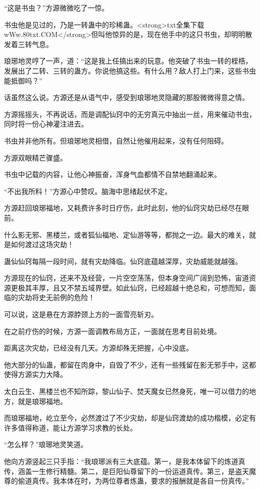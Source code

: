 \begin{this_body}
“这是书虫？”方源微微吃了一惊。

书虫他是见过的，乃是一转蛊中的珍稀蛊。<strong>txt全集下载wWw.80txt.COM</strong>但叫他惊异的是，现在他手中的这只书虫，却明明散发着三转气息。

琅琊地灵哼了一声，道：“这是我上任搞出来的玩意。他突破了书虫一转的桎梏，发展出了二转、三转的蛊方。你说他搞这些。有什么用？敌人打上门来，这些书虫能抵御吗？”

话虽然这么说。方源还是从语气中，感受到琅琊地灵隐藏的那股微微得意之情。

方源摇摇头，不再说话，而是调配仙窍中的无穷真元中抽出一丝，用来催动书虫，同时将一份心神灌注进去。

书虫并非他所有。但琅琊地灵相借，自然让他催用起来，没有任何阻碍。

方源双眼精芒骤盛。

书虫中记载的内容，让他心神振奋，浑身气血都情不自禁地翻涌起来。

“不出我所料！”方源心中赞叹。脑海中思绪起伏不定。

方源赶回琅琊福地，又耗费许多时日疗伤，此时此刻，他的仙窍灾劫已经尽在眼前。

什么影无邪、黑楼兰，或者狐仙福地、定仙游等等，都抛之一边。最大的难关，就是如何渡过这场灾劫！

蛊仙仙窍每隔一段时间，就有灾劫降临。仙窍底蕴越深厚，灾劫威能就越强。

方源现在的仙窍，还来不及经营，一片空空荡荡，但本身空间广阔到恐怖，宙道资源更极其丰厚，且又不禁五域界壁。如此仙窍，已经超越十绝总和，可想而知，面临的灾劫将史无前例的危险！

可以说，这是悬在方源脖颈上方的一面雪亮斩刃。

在之前疗伤的时候，方源一面调教布局方正，一面就在思考目前处境。

距离这次灾劫，已经没有几天。方源却殊无把握，心中没底。

他大部分的仙蛊，都留在肉身中，自毁了不少，还有一些残留在影无邪手中，这都使得方源实力大降。

太白云生、黑楼兰也不知所踪，黎山仙子、焚天魔女已然身死，唯一可以借力的地方，就是琅琊福地。

而琅琊福地，屹立至今，必然渡过了不少灾劫，却是仙窍渡劫的成功楷模，必定有许多值得称道，能让方源学习求教的长处。

“怎么样？”琅琊地灵笑道。

他向方源竖起三只手指：“我琅琊派有三大底蕴。第一，是我本体留下的炼道真传，涵盖一生修行精髓。第二，是巨阳仙尊留下的一份运道真传。第三，是盗天魔尊的偷道真传。我本体在时，为两位尊者炼蛊，要求的报酬就是各自一份真传。”


\end{this_body}
